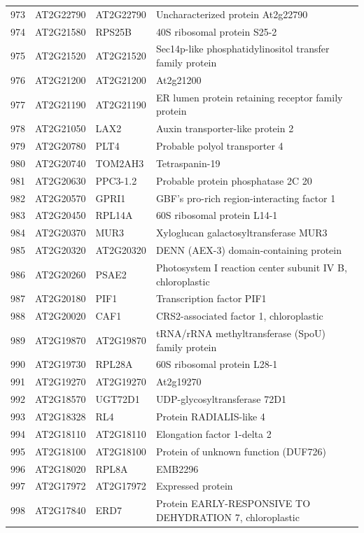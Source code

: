 \documentclass[11pt]{article}
\begin{document}
\begin{center}
\begin{tabular}{rlll}
973 & AT2G22790 & AT2G22790 & Uncharacterized protein At2g22790\\
974 & AT2G21580 & RPS25B & 40S ribosomal protein S25-2\\
975 & AT2G21520 & AT2G21520 & Sec14p-like phosphatidylinositol transfer family protein\\
976 & AT2G21200 & AT2G21200 & At2g21200\\
977 & AT2G21190 & AT2G21190 & ER lumen protein retaining receptor family protein\\
978 & AT2G21050 & LAX2 & Auxin transporter-like protein 2\\
979 & AT2G20780 & PLT4 & Probable polyol transporter 4\\
980 & AT2G20740 & TOM2AH3 & Tetraspanin-19\\
981 & AT2G20630 & PPC3-1.2 & Probable protein phosphatase 2C 20\\
982 & AT2G20570 & GPRI1 & GBF's pro-rich region-interacting factor 1\\
983 & AT2G20450 & RPL14A & 60S ribosomal protein L14-1\\
984 & AT2G20370 & MUR3 & Xyloglucan galactosyltransferase MUR3\\
985 & AT2G20320 & AT2G20320 & DENN (AEX-3) domain-containing protein\\
986 & AT2G20260 & PSAE2 & Photosystem I reaction center subunit IV B, chloroplastic\\
987 & AT2G20180 & PIF1 & Transcription factor PIF1\\
988 & AT2G20020 & CAF1 & CRS2-associated factor 1, chloroplastic\\
989 & AT2G19870 & AT2G19870 & tRNA/rRNA methyltransferase (SpoU) family protein\\
990 & AT2G19730 & RPL28A & 60S ribosomal protein L28-1\\
991 & AT2G19270 & AT2G19270 & At2g19270\\
992 & AT2G18570 & UGT72D1 & UDP-glycosyltransferase 72D1\\
993 & AT2G18328 & RL4 & Protein RADIALIS-like 4\\
994 & AT2G18110 & AT2G18110 & Elongation factor 1-delta 2\\
995 & AT2G18100 & AT2G18100 & Protein of unknown function (DUF726)\\
996 & AT2G18020 & RPL8A & EMB2296\\
997 & AT2G17972 & AT2G17972 & Expressed protein\\
998 & AT2G17840 & ERD7 & Protein EARLY-RESPONSIVE TO DEHYDRATION 7, chloroplastic\\

\end{tabular}
\end{center}
\end{document}
